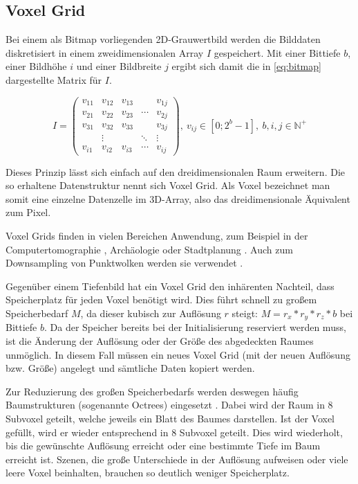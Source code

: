 \subsection{Voxel Grid}
\label{subsec:voxel-grid}

Bei einem als Bitmap vorliegenden 2D-Grauwertbild werden die Bilddaten diskretisiert in einem zweidimensionalen Array $I$ gespeichert.
Mit einer Bittiefe $b$, einer Bildhöhe $i$ und einer Bildbreite $j$ ergibt sich damit die in \autoref{eq:bitmap} dargestellte Matrix für $I$.

\begin{equation}
I = \begin{pmatrix}
v_{11} & v_{12} & v_{13} &        & v_{1j}\\
v_{21} & v_{22} & v_{23} & \cdots & v_{2j}\\
v_{31} & v_{32} & v_{33} &        & v_{3j}\\
       & \vdots &        & \ddots & \vdots\\
v_{i1} & v_{i2} & v_{i3} & \cdots & v_{ij}
\end{pmatrix},\ v_{ij} \in [0; 2^b - 1],\ b, i, j \in \mathbb{N}^+
\label{eq:bitmap}
\end{equation}

Dieses Prinzip lässt sich einfach auf den dreidimensionalen Raum erweitern.
Die so erhaltene Datenstruktur nennt sich Voxel Grid.
Als Voxel bezeichnet man somit eine einzelne Datenzelle im 3D-Array, also das dreidimensionale Äquivalent zum Pixel.

Voxel Grids finden in vielen Bereichen Anwendung, zum Beispiel in der Computertomographie \cite[15]{carr1996surface}, Archäologie oder Stadtplanung \cite{chmielewski2017estimating}.
Auch zum Downsampling von Punktwolken werden sie verwendet \cite{pclVoxelGrid}.

Gegenüber einem Tiefenbild hat ein Voxel Grid den inhärenten Nachteil, dass Speicherplatz für jeden Voxel benötigt wird.
Dies führt schnell zu großem Speicherbedarf $M$, da dieser kubisch zur Auflösung $r$ steigt: $M = r_x * r_y * r_z * b$ bei Bittiefe $b$.
Da der Speicher bereits bei der Initialisierung reserviert werden muss, ist die Änderung der Auflösung oder der Größe des abgedeckten Raumes unmöglich.
In diesem Fall müssen ein neues Voxel Grid (mit der neuen Auflösung bzw. Größe) angelegt und sämtliche Daten kopiert werden.

Zur Reduzierung des großen Speicherbedarfs werden deswegen häufig Baumstrukturen (sogenannte Octrees) eingesetzt \cite{meagher1982efficient}.
Dabei wird der Raum in 8 Subvoxel geteilt, welche jeweils ein Blatt des Baumes darstellen.
Ist der Voxel gefüllt, wird er wieder entsprechend in 8 Subvoxel geteilt.
Dies wird wiederholt, bis die gewünschte Auflösung erreicht oder eine bestimmte Tiefe im Baum erreicht ist.
Szenen, die große Unterschiede in der Auflösung aufweisen oder viele leere Voxel beinhalten, brauchen so deutlich weniger Speicherplatz.

